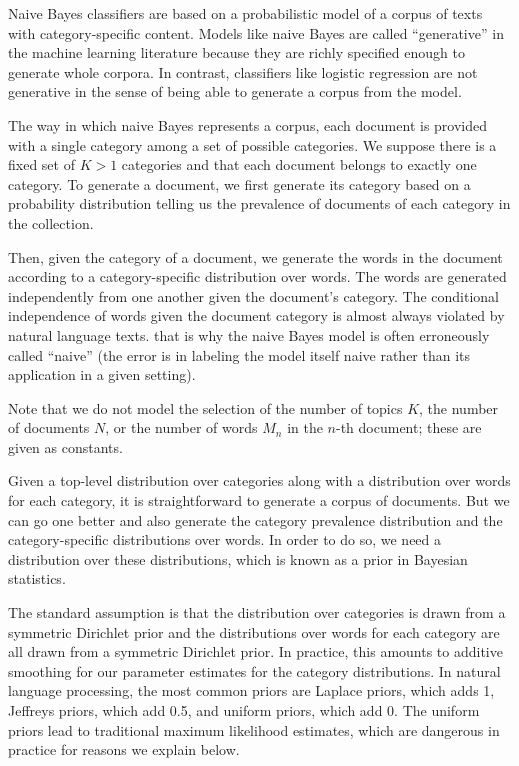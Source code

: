 Naive Bayes classifiers are based on a probabilistic model of a corpus
of texts with category-specific content.  Models like naive Bayes are
called ``generative'' in the machine learning literature because they
are richly specified enough to generate whole corpora.  In contrast,
classifiers like logistic regression are not generative in the sense
of being able to generate a corpus from the model.

The way in which naive Bayes represents a corpus, each document is
provided with a single category among a set of possible categories.
We suppose there is a fixed set of $K > 1$ categories and that each
document belongs to exactly one category.  To generate a document, we
first generate its category based on a probability distribution
telling us the prevalence of documents of each category in the
collection.

Then, given the category of a document, we generate the words in the
document according to a category-specific distribution over words.
The words are generated independently from one another given the
document's category.  The conditional independence of words given the
document category is almost always violated by natural language texts.
that is why the naive Bayes model is often erroneously called
``naive'' (the error is in labeling the model itself naive rather
than its application in a given setting).

Note that we do not model the selection of the number of topics $K$,
the number of documents $N$, or the number of words $M_n$ in the
$n$-th document; these are given as constants.  

Given a top-level distribution over categories along with a
distribution over words for each category, it is straightforward to
generate a corpus of documents.  But we can go one better and also
generate the category prevalence distribution and the
category-specific distributions over words.  In order to do so, we
need a distribution over these distributions, which is known as a
prior in Bayesian statistics.

The standard assumption is that the distribution over categories is
drawn from a symmetric Dirichlet prior and the distributions over
words for each category are all drawn from a symmetric Dirichlet
prior.  In practice, this amounts to additive smoothing for our
parameter estimates for the category distributions.  In natural
language processing, the most common priors are Laplace priors, which
adds 1, Jeffreys priors, which add 0.5, and uniform priors, which add
0.  The uniform priors lead to traditional maximum likelihood
estimates, which are dangerous in practice for reasons we explain
below.


